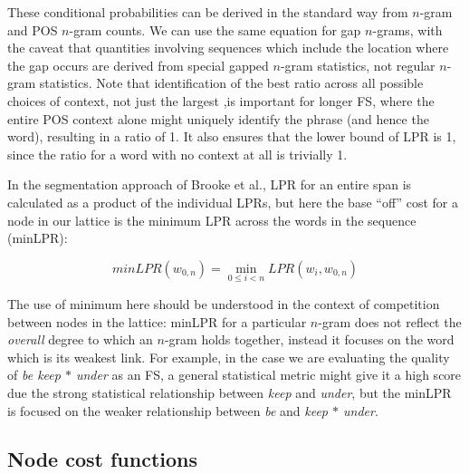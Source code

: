 \documentclass[11pt]{article}
\makeatletter
\def \al {al.\@ }
\newcommand{\gap}{$*$\xspace}
\newcommand{\ex}[1]{\textit{#1}\xspace}
\makeatother
\begin{document}
These conditional probabilities can be derived in the standard way from $n$-gram and POS $n$-gram counts. We can use the same equation for gap $n$-grams, with the caveat that quantities involving sequences which include the location where the gap occurs are derived from special gapped $n$-gram statistics, not regular $n$-gram statistics. Note that identification of the best ratio across all possible choices of context, not just the largest ,is important for longer FS, where the entire POS context alone might uniquely identify the phrase (and hence the word), resulting in a ratio of 1. It also ensures that the lower bound of LPR is 1, since the ratio for a word with no context at all is trivially 1.

In the segmentation approach of Brooke et \al {}, LPR for an entire span is calculated as a product of the individual LPRs, but here the base ``off'' cost for a node in our lattice is the minimum LPR across the words in the sequence (minLPR):

\begin{displaymath}
minLPR(w_{0,n}) = \min_{0 \leq i < n }{LPR(w_i,w_{0,n})}
\end{displaymath}

The use of minimum here should be understood in the context of competition between nodes in the lattice: minLPR for a particular $n$-gram does not reflect the \emph{overall}
degree to which an $n$-gram holds together, instead it focuses on the word which is its weakest link. For example, in the case we are evaluating the quality of \ex{be keep \gap under} as an FS, a general statistical metric might give it a high score due the strong statistical relationship between \ex{keep} and \ex{under}, but the minLPR is focused on the weaker relationship between \ex{be} and \ex{keep \gap under}.


\subsection{Node cost functions}
\end{document}
